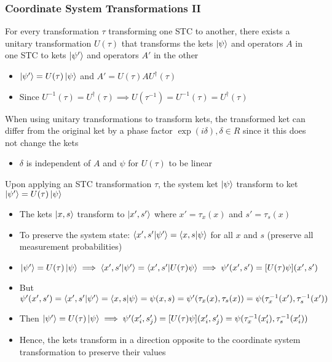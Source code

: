 \documentclass[8pt,t,mathserif,aspectratio=169]{beamer}
\begin{document}
\begin{frame}
  \frametitle{Coordinate System Transformations II}
  \vspace{1mm}
  For every transformation $\tau$ transforming one STC to another, there exists a unitary transformation $U(\tau)$ that transforms the kets $\ket{\psi}$ and operators $A$ in one STC to kets $\ket{\psi'}$ and operators $A'$ in the other
  \begin{itemize}
    \item $\ket{\psi'} = U(\tau) \ket{\psi}$ and $A' = U(\tau) A U^{\dagger}(\tau)$
    \item Since $U^{-1}(\tau) = U^{\dagger}(\tau) \implies U(\tau^{-1}) = U^{-1}(\tau) = U^{\dagger}(\tau)$
  \end{itemize}
  When using unitary transformations to transform kets, the transformed ket can differ from the original ket by a phase factor $\exp(i \delta), \delta \in R$ since it this does not change the kets 
  \begin{itemize}
    \item $\delta$ is independent of $A$ and $\psi$ for $U(\tau)$ to be linear
  \end{itemize}
  Upon applying an STC transformation $\tau$, the system ket $\ket{\psi}$ transform to ket $\ket{\psi'} = U(\tau) \ket{\psi}$
  \begin{itemize}
    \item The kets $\ket{x,s}$ transform to $\ket{x',s'}$ where $x' = \tau_x(x)$ and $s' = \tau_s(x)$
    \item To preserve the system state: $\braket{x',s'}{\psi'} = \braket{x,s}{\psi}$ for all $x$ and $s$ (preserve all measurement probabilities)
    \item $\ket{\psi'} = U(\tau) \ket{\psi} \implies \braket{x',s'}{\psi'} = \braket{x',s'}{U(\tau) \psi} \implies \psi'(x',s') = [U(\tau) \psi](x',s')$
    \item But $\psi'(x',s') = \braket{x',s'}{\psi'} = \braket{x,s}{\psi} = \psi(x,s) = \psi'(\tau_x(x),\tau_s(x)) = \psi(\tau^{-1}_x(x'),\tau^{-1}_s(x'))$ 
    \item Then $\ket{\psi'} = U(\tau) \ket{\psi} \implies \psi'(x'_i,s'_j) = [U(\tau) \psi](x'_i,s'_j) = \psi(\tau^{-1}_x(x'_i),\tau^{-1}_s(x'_i))$
    \item Hence, the kets transform in a direction opposite to the coordinate system transformation to preserve their values
  \end{itemize}
\end{frame}
\end{document}
